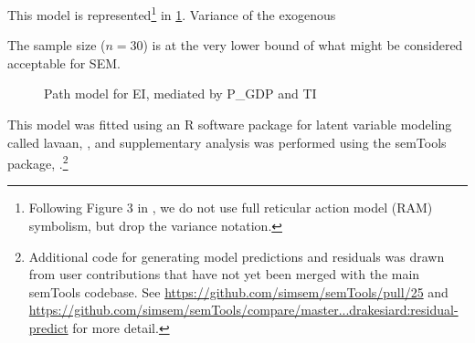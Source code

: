 \documentclass[11pt]{article}
\newcommand{\pkg}[1]{{\fontseries{b}\selectfont #1}}
\begin{document}
This model is represented\footnote{
Following Figure 3 in \cite{panHowIndustrializationTrade2019}, we do not use full reticular action model (RAM) symbolism, but drop the variance notation.
} in \cref{fig:original_model}. Variance of the exogenous 

The sample size ($n=30$) is at the very lower bound of what might be considered acceptable for SEM.

\begin{figure}[htbp]
\centering
{}
\caption{Path model for EI, mediated by P\_GDP and TI}
\label{fig:original_model}
\end{figure}






This model was fitted using an R software package for latent variable modeling called \pkg{lavaan}, \cite{rosseelLavaanPackageStructural2012}, and supplementary analysis was performed using the \pkg{semTools} package, \cite{jorgensenSemToolsUsefulTools2019}.\footnote{
Additional code for generating model predictions and residuals was drawn from user contributions that have not yet been merged with the main \pkg{semTools} codebase.
See \url{https://github.com/simsem/semTools/pull/25} and \url{https://github.com/simsem/semTools/compare/master...drakesiard:residual-predict} for more detail.
}
\end{document}
